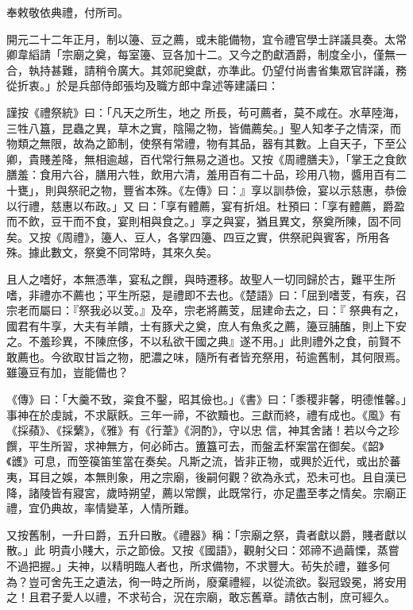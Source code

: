 \begin{pinyinscope}
 奉敕敬依典禮，付所司。



 開元二十二年正月，制以籩、豆之薦，或未能備物，宜令禮官學士詳議具奏。太常卿韋縚請「宗廟之奠，每室籩、豆各加十二。又今之酌獻酒爵，制度全小，僅無一合，執持甚難，請稍令廣大。其郊祀奠獻，亦準此。仍望付尚書省集眾官詳議，務從折衷。」於是兵部侍郎張均及職方郎中韋述等建議曰：



 謹按《禮祭統》曰：「凡天之所生，地之
 所長，茍可薦者，莫不咸在。水草陸海，三牲八簋，昆蟲之異，草木之實，陰陽之物，皆備薦矣。」聖人知孝子之情深，而物類之無限，故為之節制，使祭有常禮，物有其品，器有其數。上自天子，下至公卿，貴賤差降，無相逾越，百代常行無易之道也。又按《周禮膳夫》，「掌王之食飲膳羞：食用六谷，膳用六牲，飲用六清，羞用百有二十品，珍用八物，醬用百有二十甕」，則與祭祀之物，豐省本殊。《左傳》曰：』享以訓恭儉，宴以示慈惠，恭儉以行禮，慈惠以布政。」又
 曰：「享有體薦，宴有折俎。杜預曰：「享有體薦，爵盈而不飲，豆干而不食，宴則相與食之。」享之與宴，猶且異文，祭奠所陳，固不同矣。又按《周禮》，籩人、豆人，各掌四籩、四豆之實，供祭祀與賓客，所用各殊。據此數文，祭奠不同常時，其來久矣。



 且人之嗜好，本無憑準，宴私之饌，與時遷移。故聖人一切同歸於古，難平生所嗜，非禮亦不薦也；平生所惡，是禮即不去也。《楚語》曰：「屈到嗜芰，有疾，召宗老而屬曰：『祭我必以芰。』及卒，宗老將薦芰，屈建命去之，曰：『
 祭典有之，國君有牛享，大夫有羊饋，士有豚犬之奠，庶人有魚炙之薦，籩豆脯醢，則上下安之。不羞珍異，不陳庶侈，不以私欲干國之典』遂不用。」此則禮外之食，前賢不敢薦也。今欲取甘旨之物，肥濃之味，隨所有者皆充祭用，茍逾舊制，其何限焉。雖籩豆有加，豈能備也？



 《傳》曰：「大羹不致，粢食不鑿，昭其儉也。」《書》曰：「黍稷非馨，明德惟馨。」事神在於虔誠，不求厭飫。三年一禘，不欲黷也。三獻而終，禮有成也。《風》有《採蘋》、《採蘩》，《雅》有《行葦》《泂酌》，守以忠
 信，神其舍諸！若以今之珍饌，平生所習，求神無方，何必師古。簠簋可去，而盤盂杯案當在御矣。《韶》《頀》可息，而箜篌笛笙當在奏矣。凡斯之流，皆非正物，或興於近代，或出於蕃夷，耳目之娛，本無則象，用之宗廟，後嗣何觀？欲為永式，恐未可也。且自漢已降，諸陵皆有寢宮，歲時朔望，薦以常饌，此既常行，亦足盡至孝之情矣。宗廟正禮，宜仍典故，率情變革，人情所難。



 又按舊制，一升曰爵，五升曰散。《禮器》稱：「宗廟之祭，貴者獻以爵，賤者獻以散。」此
 明貴小賤大，示之節儉。又按《國語》，觀射父曰：郊禘不過繭慄，蒸嘗不過把握。」夫神，以精明臨人者也，所求備物，不求豐大。茍失於禮，雖多何為？豈可舍先王之遺法，徇一時之所尚，廢棄禮經，以從流欲。裂冠毀冕，將安用之！且君子愛人以禮，不求茍合，況在宗廟，敢忘舊章。請依古制，庶可經久。




\end{pinyinscope}
